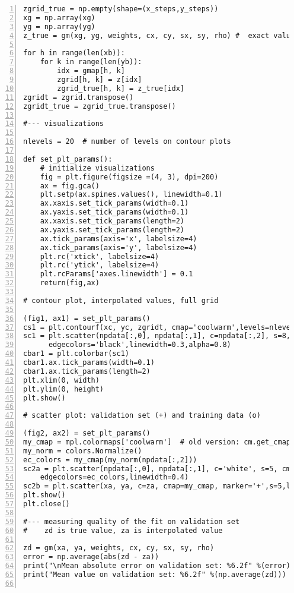 \documentclass[oneside,10pt]{book}
\begin{document}
\begin{lstlisting}[numbers=left]
zgrid_true = np.empty(shape=(x_steps,y_steps))
xg = np.array(xg)
yg = np.array(yg)
z_true = gm(xg, yg, weights, cx, cy, sx, sy, rho) #  exact values on the grid

for h in range(len(xb)):
    for k in range(len(yb)):
        idx = gmap[h, k]
        zgrid[h, k] = z[idx]  
        zgrid_true[h, k] = z_true[idx]
zgridt = zgrid.transpose() 
zgridt_true = zgrid_true.transpose() 

#--- visualizations

nlevels = 20  # number of levels on contour plots

def set_plt_params():
    # initialize visualizations
    fig = plt.figure(figsize =(4, 3), dpi=200) 
    ax = fig.gca()
    plt.setp(ax.spines.values(), linewidth=0.1)
    ax.xaxis.set_tick_params(width=0.1)
    ax.yaxis.set_tick_params(width=0.1)
    ax.xaxis.set_tick_params(length=2)
    ax.yaxis.set_tick_params(length=2)
    ax.tick_params(axis='x', labelsize=4)
    ax.tick_params(axis='y', labelsize=4)
    plt.rc('xtick', labelsize=4) 
    plt.rc('ytick', labelsize=4) 
    plt.rcParams['axes.linewidth'] = 0.1
    return(fig,ax)

# contour plot, interpolated values, full grid

(fig1, ax1) = set_plt_params() 
cs1 = plt.contourf(xc, yc, zgridt, cmap='coolwarm',levels=nlevels,linewidths=0.1)  
sc1 = plt.scatter(npdata[:,0], npdata[:,1], c=npdata[:,2], s=8, cmap=cm.coolwarm,
      edgecolors='black',linewidth=0.3,alpha=0.8)
cbar1 = plt.colorbar(sc1)
cbar1.ax.tick_params(width=0.1) 
cbar1.ax.tick_params(length=2) 
plt.xlim(0, width)
plt.ylim(0, height)
plt.show()
           
# scatter plot: validation set (+) and training data (o)         

(fig2, ax2) = set_plt_params()
my_cmap = mpl.colormaps['coolwarm']  # old version: cm.get_cmap('coolwarm')
my_norm = colors.Normalize()
ec_colors = my_cmap(my_norm(npdata[:,2]))
sc2a = plt.scatter(npdata[:,0], npdata[:,1], c='white', s=5, cmap=my_cmap, 
    edgecolors=ec_colors,linewidth=0.4)
sc2b = plt.scatter(xa, ya, c=za, cmap=my_cmap, marker='+',s=5,linewidth=0.4)
plt.show()
plt.close()

#--- measuring quality of the fit on validation set
#    zd is true value, za is interpolated value

zd = gm(xa, ya, weights, cx, cy, sx, sy, rho) 
error = np.average(abs(zd - za)) 
print("\nMean absolute error on validation set: %6.2f" %(error))
print("Mean value on validation set: %6.2f" %(np.average(zd)))


\end{lstlisting}
\end{document}
